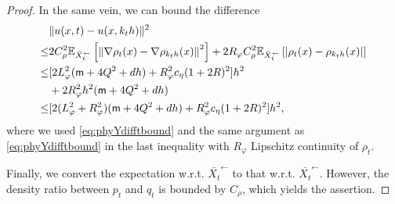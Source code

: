 \begin{proof}
In the same vein, we can bound the difference 
\begin{align}
&  \| u(x,t) - u(x,k_th) \|^2 \\
\leq &
2C_\rho^2 \mathbb{E}_{\bar{X}_t^\leftarrow} \left[  \left\| \nabla \rho_{t}(x) - \nabla \rho_{k_t h}(x) \right\|^2 \right]
+ 2 R_\varphi C_\rho^2  
\mathbb{E}_{\bar{X}_t^\leftarrow} \left[ |\rho_{t}(x) - \rho_{k_t h}(x)|  \right] \\
\leq &
[2 L_\varphi^2 (\mathsf{m} + 4Q^2 + d h)  
+ R_\varphi^2 c_\eta (1 + 2R)^2] h^2 \\
& +  2 R_\varphi^2 h^2 (\mathsf{m} + 4Q^2 + d h)   \\
\leq & 
[2 (L_\varphi^2+R_\varphi^2) (\mathsf{m} + 4Q^2 + d h)  
+ R_\varphi^2 c_\eta (1 + 2R)^2] h^2, 
\end{align}
where we used \eqref{eq:phyYdifftbound} and the same argument as \eqref{eq:phyYdifftbound} in the last inequality with $R_\varphi$ Lipschitz continuity of $\rho_{t}$. 


Finally, we convert the expectation w.r.t. $\bar{X_t}^\leftarrow$ to that w.r.t. $\bar{X_t}^\leftarrow$. However, the density ratio between $p_t$ and $q_t$ is bounded by $C_\rho$,
which yields the assertion. 
\end{proof}